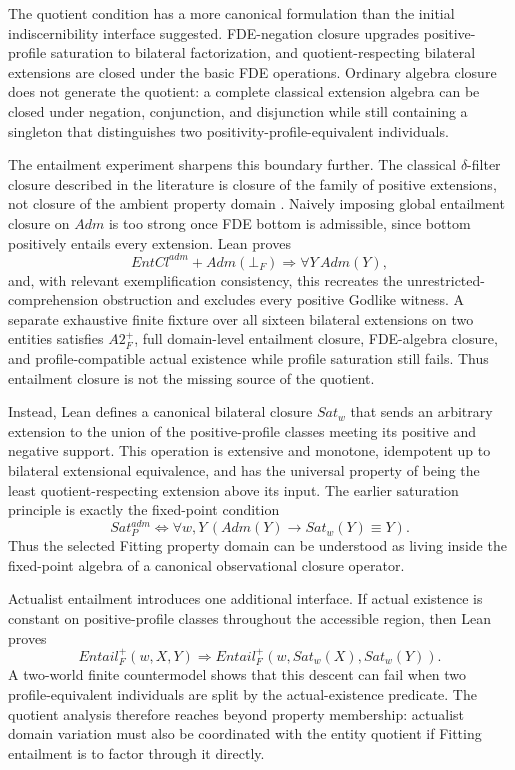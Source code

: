 The quotient condition has a more canonical formulation than the initial indiscernibility interface suggested. FDE-negation closure upgrades positive-profile saturation to bilateral factorization, and quotient-respecting bilateral extensions are closed under the basic FDE operations. Ordinary algebra closure does not generate the quotient: a complete classical extension algebra can be closed under negation, conjunction, and disjunction while still containing a singleton that distinguishes two positivity-profile-equivalent individuals.

The entailment experiment sharpens this boundary further. The classical \(\delta\)-filter closure described in the literature is closure of the family of positive extensions, not closure of the ambient property domain \cite{BenzmuellerFuenmayor2019}. Naively imposing global entailment closure on \(Adm\) is too strong once FDE bottom is admissible, since bottom positively entails every extension. Lean proves
\[
  EntCl^{adm}+Adm(\bot_F)
  \Longrightarrow
  \forall Y\,Adm(Y),
\]
and, with relevant exemplification consistency, this recreates the unrestricted-comprehension obstruction and excludes every positive Godlike witness. A separate exhaustive finite fixture over all sixteen bilateral extensions on two entities satisfies \(A2_F^+\), full domain-level entailment closure, FDE-algebra closure, and profile-compatible actual existence while profile saturation still fails. Thus entailment closure is not the missing source of the quotient.

Instead, Lean defines a canonical bilateral closure \(Sat_w\) that sends an arbitrary extension to the union of the positive-profile classes meeting its positive and negative support. This operation is extensive and monotone, idempotent up to bilateral extensional equivalence, and has the universal property of being the least quotient-respecting extension above its input. The earlier saturation principle is exactly the fixed-point condition
\[
  Sat_P^{adm}
  \Longleftrightarrow
  \forall w,Y\,(Adm(Y)\rightarrow Sat_w(Y)\equiv Y).
\]
Thus the selected Fitting property domain can be understood as living inside the fixed-point algebra of a canonical observational closure operator.

Actualist entailment introduces one additional interface. If actual existence is constant on positive-profile classes throughout the accessible region, then Lean proves
\[
  Entail_F^+(w,X,Y)
  \Longrightarrow
  Entail_F^+(w,Sat_w(X),Sat_w(Y)).
\]
A two-world finite countermodel shows that this descent can fail when two profile-equivalent individuals are split by the actual-existence predicate. The quotient analysis therefore reaches beyond property membership: actualist domain variation must also be coordinated with the entity quotient if Fitting entailment is to factor through it directly.

